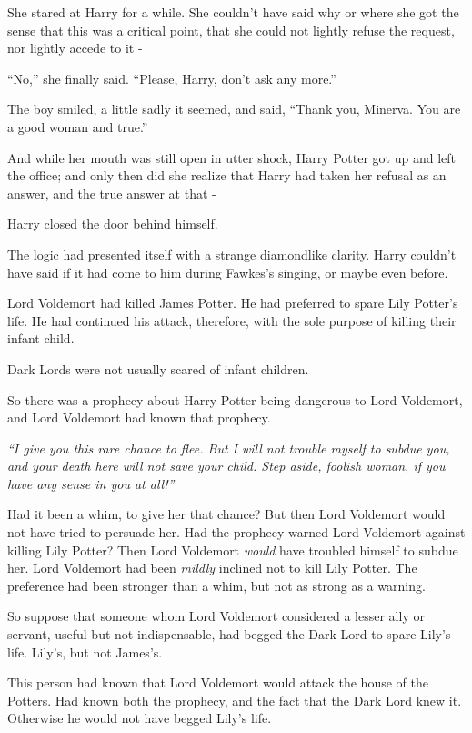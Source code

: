 She stared at Harry for a while. She couldn't have said why or where she got the sense that this was a critical point, that she could not lightly refuse the request, nor lightly accede to it -

``No,'' she finally said. ``Please, Harry, don't ask any more.''

The boy smiled, a little sadly it seemed, and said, ``Thank you, Minerva. You are a good woman and true.''

And while her mouth was still open in utter shock, Harry Potter got up and left the office; and only then did she realize that Harry had taken her refusal as an answer, and the true answer at that -

Harry closed the door behind himself.

The logic had presented itself with a strange diamondlike clarity. Harry couldn't have said if it had come to him during Fawkes's singing, or maybe even before.

Lord Voldemort had killed James Potter. He had preferred to spare Lily Potter's life. He had continued his attack, therefore, with the sole purpose of killing their infant child.

Dark Lords were not usually scared of infant children.

So there was a prophecy about Harry Potter being dangerous to Lord Voldemort, and Lord Voldemort had known that prophecy.

\emph{``I give you this rare chance to flee. But I will not trouble myself to subdue you, and your death here will not save your child. Step aside, foolish woman, if you have any sense in you at all!''}

Had it been a whim, to give her that chance? But then Lord Voldemort would not have tried to persuade her. Had the prophecy warned Lord Voldemort against killing Lily Potter? Then Lord Voldemort \emph{would} have troubled himself to subdue her. Lord Voldemort had been \emph{mildly} inclined not to kill Lily Potter. The preference had been stronger than a whim, but not as strong as a warning.

So suppose that someone whom Lord Voldemort considered a lesser ally or servant, useful but not indispensable, had begged the Dark Lord to spare Lily's life. Lily's, but not James's.

This person had known that Lord Voldemort would attack the house of the Potters. Had known both the prophecy, and the fact that the Dark Lord knew it. Otherwise he would not have begged Lily's life.

